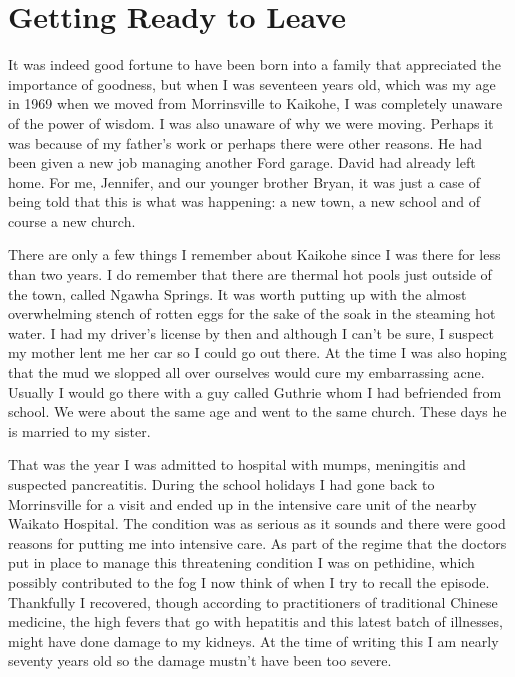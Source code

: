 \chapter{Getting Ready to Leave}

It was indeed good fortune to have been born into a family that
appreciated the importance of goodness, but when I was seventeen years
old, which was my age in 1969 when we moved from Morrinsville to
Kaikohe, I was completely unaware of the power of wisdom. I was also
unaware of why we were moving. Perhaps it was because of my father's
work or perhaps there were other reasons. He had been given a new job
managing another Ford garage. David had already left home. For me,
Jennifer, and our younger brother Bryan, it was just a case of being
told that this is what was happening: a new town, a new school and of
course a new church.

There are only a few things I remember about Kaikohe since I was there
for less than two years. I do remember that there are thermal hot pools
just outside of the town, called Ngawha Springs. It was worth putting up
with the almost overwhelming stench of rotten eggs for the sake of the
soak in the steaming hot water. I had my driver's license by then and
although I can't be sure, I suspect my mother lent me her car so I could
go out there. At the time I was also hoping that the mud we slopped all
over ourselves would cure my embarrassing acne. Usually I would go there
with a guy called Guthrie whom I had befriended from school. We were
about the same age and went to the same church. These days he is married
to my sister.

That was the year I was admitted to hospital with mumps, meningitis and
suspected pancreatitis. During the school holidays I had gone back to
Morrinsville for a visit and ended up in the intensive care unit of the
nearby Waikato Hospital. The condition was as serious as it sounds and
there were good reasons for putting me into intensive care. As part of
the regime that the doctors put in place to manage this threatening
condition I was on pethidine, which possibly contributed to the fog I
now think of when I try to recall the episode. Thankfully I recovered,
though according to practitioners of traditional Chinese medicine, the
high fevers that go with hepatitis and this latest batch of illnesses,
might have done damage to my kidneys. At the time of writing this I am
nearly seventy years old so the damage mustn't have been too severe.

